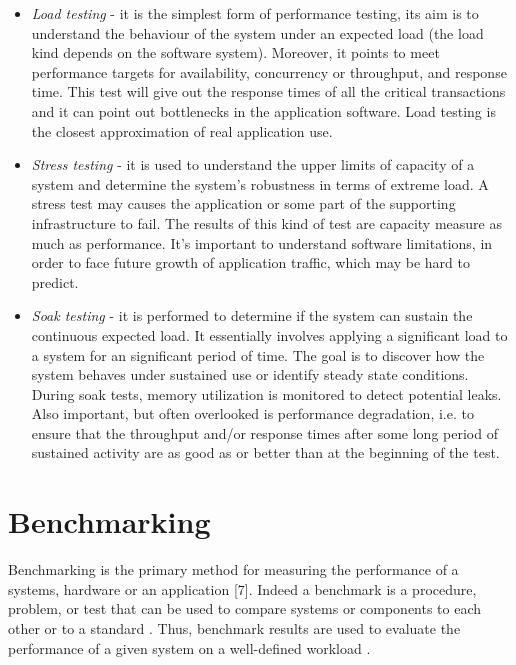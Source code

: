 \begin{itemize}
\item \textit{Load testing} - it is the simplest form of performance testing, its aim is to understand the behaviour of the system under an expected load (the load kind depends on the software system). Moreover, it points to meet performance targets for availability, concurrency or throughput, and response time. This test will give out the response times of all the critical transactions and it can point out bottlenecks in the application software. Load testing is the closest approximation of real application use.

\item \textit{Stress testing} -  it is used to understand the upper limits of capacity of a system and determine the system's robustness in terms of extreme load. A stress test may causes the application or some part of the supporting infrastructure to fail. The results of this kind of test are  capacity measure as much as performance. It's important to understand software limitations, in order to face future growth of application traffic, which may be hard to predict.

\item \textit{Soak testing} - it is performed to determine if the system can sustain the continuous expected load. It essentially involves applying a significant load to a system for an significant period of time. The goal is to discover how the system behaves under sustained use or identify steady state conditions. During soak tests, memory utilization is monitored to detect potential leaks. Also important, but often overlooked is performance degradation, i.e. to ensure that the throughput and/or response times after some long period of sustained activity are as good as or better than at the beginning of the test. 
\end{itemize} 

\section{Benchmarking}\label{sec:benchmarking}

Benchmarking is the primary method for measuring the performance of a systems, hardware or an application [7]. Indeed a benchmark is a procedure, problem, or test that can be used to compare systems or components to each other or to a standard \cite{IEEEStd610.12-1990:glossary}. Thus, benchmark results are used to evaluate the performance of a given system on a well-defined workload \cite{Menasce:2001:CPW:560806}.

